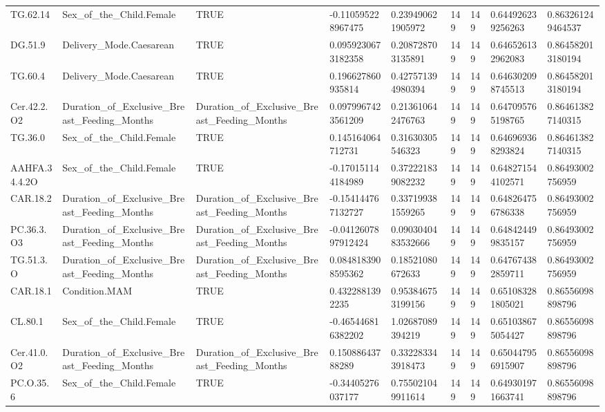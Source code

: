 \begin{longtable}{lllllllll}
TG.62.14 & Sex\_of\_the\_Child.Female & TRUE & -0.110595228967475 & 0.239490621905972 & 149 & 149 & 0.644926239256263 & 0.863261249464537 \\
DG.51.9 & Delivery\_Mode.Caesarean & TRUE & 0.0959230673182358 & 0.208728703135891 & 149 & 149 & 0.646526132962083 & 0.864582013180194 \\
TG.60.4 & Delivery\_Mode.Caesarean & TRUE & 0.196627860935814 & 0.427571394980394 & 149 & 149 & 0.646302098745513 & 0.864582013180194 \\
Cer.42.2.O2 & Duration\_of\_Exclusive\_Breast\_Feeding\_Months & Duration\_of\_Exclusive\_Breast\_Feeding\_Months & 0.0979967423561209 & 0.213610642476763 & 149 & 149 & 0.647095765198765 & 0.864613827140315 \\
TG.36.0 & Sex\_of\_the\_Child.Female & TRUE & 0.145164064712731 & 0.31630305546323 & 149 & 149 & 0.646969368293824 & 0.864613827140315 \\
AAHFA.34.4.2O & Sex\_of\_the\_Child.Female & TRUE & -0.170151144184989 & 0.372221839082232 & 149 & 149 & 0.648271544102571 & 0.86493002756959 \\
CAR.18.2 & Duration\_of\_Exclusive\_Breast\_Feeding\_Months & Duration\_of\_Exclusive\_Breast\_Feeding\_Months & -0.154144767132727 & 0.337199381559265 & 149 & 149 & 0.648264756786338 & 0.86493002756959 \\
PC.36.3.O3 & Duration\_of\_Exclusive\_Breast\_Feeding\_Months & Duration\_of\_Exclusive\_Breast\_Feeding\_Months & -0.0412607897912424 & 0.0903040483532666 & 149 & 149 & 0.648424499835157 & 0.86493002756959 \\
TG.51.3.O & Duration\_of\_Exclusive\_Breast\_Feeding\_Months & Duration\_of\_Exclusive\_Breast\_Feeding\_Months & 0.0848183908595362 & 0.18521080672633 & 149 & 149 & 0.647674382859711 & 0.86493002756959 \\
CAR.18.1 & Condition.MAM & TRUE & 0.4322881392235 & 0.953846753199156 & 149 & 149 & 0.651083281805021 & 0.86556098898796 \\
CL.80.1 & Sex\_of\_the\_Child.Female & TRUE & -0.465446816382202 & 1.02687089394219 & 149 & 149 & 0.651038675054427 & 0.86556098898796 \\
Cer.41.0.O2 & Duration\_of\_Exclusive\_Breast\_Feeding\_Months & Duration\_of\_Exclusive\_Breast\_Feeding\_Months & 0.15088643788289 & 0.332283343918473 & 149 & 149 & 0.650447956915907 & 0.86556098898796 \\
PC.O.35.6 & Sex\_of\_the\_Child.Female & TRUE & -0.34405276037177 & 0.755021049911614 & 149 & 149 & 0.649301971663741 & 0.86556098898796 \\

\end{longtable}
